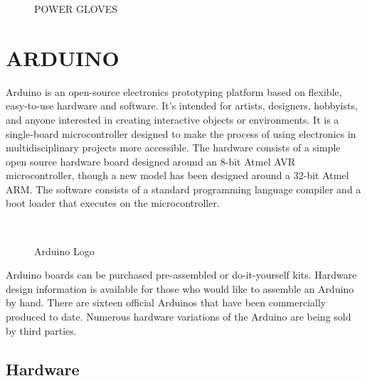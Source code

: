 \documentclass[a4paper, 12pt, notitlepage]{report}
\begin{document}
\begin{figure}[h!]
{}
\caption{POWER GLOVES}
\end{figure}
 
\newpage   
\section{ARDUINO}
%
Arduino is an open-source electronics prototyping platform based on flexible, easy-to-use hardware and software. It's intended for artists, designers, hobbyists, and anyone interested in creating interactive objects or environments. It is a single-board microcontroller designed to make the process of using electronics in multidisciplinary projects more accessible. The hardware consists of a simple open source hardware board designed around an 8-bit Atmel AVR microcontroller, though a new model has been designed around a 32-bit Atmel ARM. The software consists of a standard programming language compiler and a boot loader that executes on the microcontroller.\\

\begin{figure}[h!]
{\par}
\caption{Arduino Logo} \\
\end{figure}

Arduino boards can be purchased pre-assembled or do-it-yourself kits. Hardware design information is available for those who would like to assemble an Arduino by hand. There are sixteen official Arduinos that have been commercially produced to date. Numerous hardware variations of the Arduino are being sold by third parties.\\

\subsection{Hardware}
\end{document}
